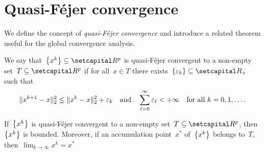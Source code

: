 \documentclass[../main]{subfiles}
\begin{document}
\section{Quasi-F\'ejer convergence} 
We define the concept of \emph{quasi-F\'ejer convergence} and introduce a related theorem useful for the global convergence analysis.
\begin{definition} 
    We say that~$\set*{x^k} \subseteq \setR^p$ is quasi-F\'ejer convergent to a non-empty set~$T \subseteq \setR^p$ if for all~$x \in T$ there exists~$\set{\varepsilon_k} \subseteq \setRpos$ such that
    \begin{equation}
        \norm{x^{k + 1} - x}_2^2 \le \norm{x^k - x}_2^2 + \varepsilon_k \eqand \sum_{\ell = 0}^{\infty} \varepsilon_\ell < + \infty \forallcondition{k = 0, 1, \dots}
    .\end{equation} 
\end{definition}

\begin{theorem} 
    If~$\set*{x^k}$ is quasi-F\'ejer convergent to a non-empty set~$T \subseteq \setR^p$, then~$\set*{x^k}$ is bounded.
    Moreover, if an accumulation point~$x^*$ of~$\set*{x^k}$ belongs to~$T$, then~$\lim_{k \to \infty} x^k = x^*$
\end{theorem}
\end{document}
